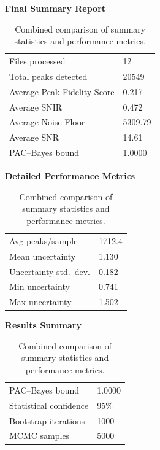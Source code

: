 \begin{table}[ht]
\centering
\begin{minipage}{0.32\linewidth}
    \centering
    \textbf{Final Summary Report}\\[4pt]
    \begin{tabular}{@{}ll@{}}
    \toprule
    Files processed & 12 \\
    Total peaks detected & 20549 \\
    Average Peak Fidelity Score & 0.217 \\
    Average SNIR & 0.472 \\
    Average Noise Floor & 5309.79 \\
    Average SNR & 14.61 \\
    PAC--Bayes bound & 1.0000 \\
    \bottomrule
    \end{tabular}
\end{minipage}
\hfill
\begin{minipage}{0.32\linewidth}
    \centering
    \textbf{Detailed Performance Metrics}\\[4pt]
    \begin{tabular}{@{}ll@{}}
    \toprule
    Avg peaks/sample & 1712.4 \\
    Mean uncertainty & 1.130 \\
    Uncertainty std.\ dev. & 0.182 \\
    Min uncertainty & 0.741 \\
    Max uncertainty & 1.502 \\
    \bottomrule
    \end{tabular}
\end{minipage}
\hfill
\begin{minipage}{0.32\linewidth}
    \centering
    \textbf{Results Summary}\\[4pt]
    \begin{tabular}{@{}ll@{}}
    \toprule
    PAC--Bayes bound & 1.0000 \\
    Statistical confidence & 95\% \\
    Bootstrap iterations & 1000 \\
    MCMC samples & 5000 \\
    \bottomrule
    \end{tabular}
\end{minipage}
\caption{Combined comparison of summary statistics and performance metrics.}
\label{tab:summary_combined}
\end{table}


